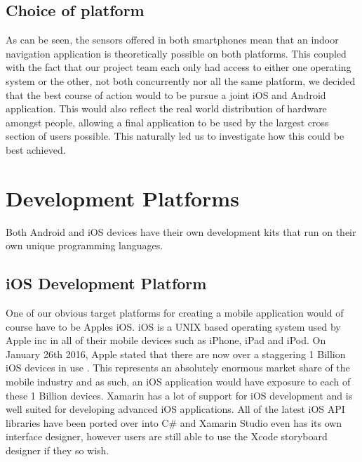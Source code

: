 \documentclass[main.tex]{subfiles}
\begin{document}
\subsection{Choice of platform}

As can be seen, the sensors offered in both smartphones mean that an indoor navigation application is theoretically possible on both platforms. This coupled with the fact that our project team each only had access to either one operating system or the other, not both concurrently nor all the same platform, we decided that the best course of action would to be pursue a joint iOS and Android application. This would also reflect the real world distribution of hardware amongst people, allowing a final application to be used by the largest cross section of users possible. This naturally led us to investigate how this could be best achieved.

\section{Development Platforms}

Both Android and iOS devices have their own development kits that run on their own unique programming languages.

\subsection{iOS Development Platform}
One of our obvious target platforms for creating a mobile application would of course have to be Apples iOS. iOS is a UNIX based operating system used by Apple inc in all of their mobile devices such as iPhone, iPad and iPod. On January 26th 2016, Apple stated that there are now over a staggering 1 Billion iOS devices in use \cite{1billios}. This represents an absolutely enormous market share of the mobile industry and as such, an iOS application would have exposure to each of these 1 Billion devices. Xamarin has a lot of support for iOS development and is well suited for developing advanced iOS applications. All of the latest iOS API libraries have been ported over into C\# and Xamarin Studio even has its own interface designer, however users are still able to use the Xcode storyboard designer if they so wish.
\end{document}
